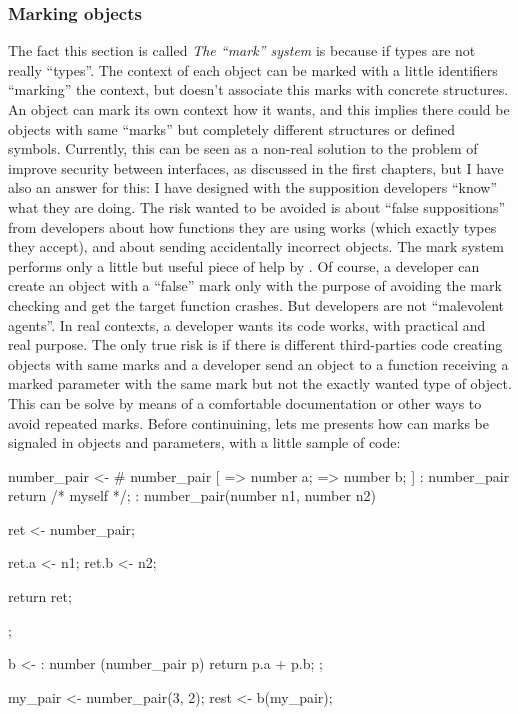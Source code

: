 \documentclass{article}
\begin{document}
\subsubsection{Marking objects}
The fact this section is called \textit{The ``mark'' system} is because if \faupp
types are not really ``types''. The context of each object can be marked with a
little identifiers ``marking'' the context, but \faupp doesn't associate this
marks with concrete structures. An object can mark its own context how it wants,
and this implies there could be objects with same ``marks'' but completely
different structures or defined symbols. Currently, this can be seen as a
non-real solution to the problem of improve security between interfaces, as
discussed in the first chapters, but I have also an answer for this: I have
designed \faupp with the supposition developers ``know'' what they are
doing. The risk wanted to be avoided is about ``false suppositions'' from
developers about how functions they are using works (which exactly types they
accept), and about sending accidentally incorrect objects. The mark system
performs only a little but useful piece of help by \faupp. Of course, a
developer can create an object with a ``false'' mark only with the purpose of
avoiding the mark checking and get the target function crashes. But developers
are not ``malevolent agents''. In real contexts, a developer wants its code
works, with practical and real purpose. The only true risk is if there is
different third-parties code creating objects with same marks and a developer
send an object to a function receiving a marked parameter with the same mark but
not the exactly wanted type of object. This can be solve by means of a
comfortable documentation or other ways to avoid repeated marks. Before
continuining, lets me presents how can marks be signaled in objects and
parameters, with a little sample of code:

\begin{faupp2}
  number_pair <-
       # number_pair [
          => number a;
          => number b;
       ]
       : number_pair
       { return /* myself */; }
       : number_pair(number n1, number n2)
       {
            ret <- number_pair;

            ret.a <- n1;
            ret.b <- n2;

            return ret;
       };

  b <- : number (number_pair p) {
            return p.a + p.b;
       };

  my_pair <- number_pair(3, 2);
  rest <- b(my_pair);
\end{faupp2}
\end{document}
